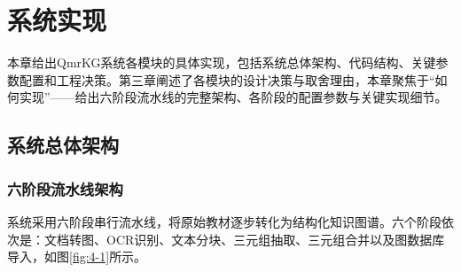 \section{系统实现}

本章给出QmrKG系统各模块的具体实现，包括系统总体架构、代码结构、关键参数配置和工程决策。第三章阐述了各模块的设计决策与取舍理由，本章聚焦于“如何实现”——给出六阶段流水线的完整架构、各阶段的配置参数与关键实现细节。

\subsection{系统总体架构}

\subsubsection{六阶段流水线架构}

系统采用六阶段串行流水线，将原始教材逐步转化为结构化知识图谱。六个阶段依次是：文档转图、OCR识别、文本分块、三元组抽取、三元组合并以及图数据库导入，如图\ref{fig:4-1}所示。


